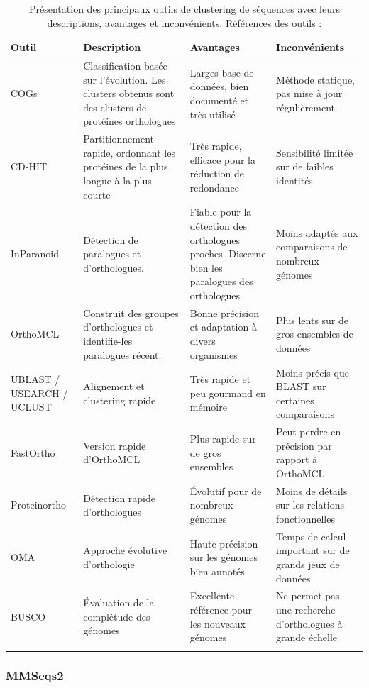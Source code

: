 \begin{longtable}{|p{}|p{}|p{}|p{}|}
\hline
\textbf{Outil} & \textbf{Description} & \textbf{Avantages} & \textbf{Inconvénients} \\
\hline
COGs & Classification basée sur l'évolution. Les clusters obtenus sont des clusters de protéines orthologues & Larges base de données, bien documenté et très utilisé & Méthode statique, pas mise à jour régulièrement. \\
\hline
CD-HIT & Partitionnement rapide, ordonnant les protéines de la plus longue à la plus courte & Très rapide, efficace pour la réduction de redondance & Sensibilité limitée sur de faibles identités \\
\hline
InParanoid & Détection de paralogues et d'orthologues. & Fiable pour la détection des orthologues proches. Discerne bien les paralogues des orthologues & Moins adaptés aux comparaisons de nombreux génomes\\
\hline
OrthoMCL & Construit des groupes d'orthologues et identifie-les paralogues récent. & Bonne précision et adaptation à divers organismes & Plus lents sur de gros ensembles de données \\
\hline
UBLAST / USEARCH / UCLUST & Alignement et clustering rapide & Très rapide et peu gourmand en mémoire & Moins précis que BLAST sur certaines comparaisons \\
\hline
FastOrtho & Version rapide d'OrthoMCL & Plus rapide sur de gros ensembles & Peut perdre en précision par rapport à OrthoMCL \\
\hline
Proteinortho & Détection rapide d'orthologues & Évolutif pour de nombreux génomes & Moins de détails sur les relations fonctionnelles \\
\hline
OMA & Approche évolutive d'orthologie & Haute précision sur les génomes bien annotés & Temps de calcul important sur de grands jeux de données \\
\hline
BUSCO & Évaluation de la complétude des génomes & Excellente référence pour les nouveaux génomes & Ne permet pas une recherche d'orthologues à grande échelle \\
\hline
\caption[Outils de clustering des séquences]{Présentation des principaux  outils de clustering de séquences avec leurs descriptions, avantages et inconvénients. Références des outils : \cite{tatusov_genomic_1997,li_sequence_2002}}
\label{tab:clustering}
\end{longtable}

\subsubsection{MMSeqs2}

